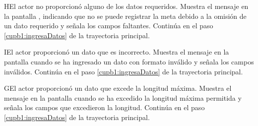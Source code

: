 \begin{UCtrayectoriaA}{H}{El actor no proporcionó alguno de los datos requeridos.}
	\UCpaso[\UCsist] Muestra el mensaje  en la pantalla ,
	indicando que no se puede registrar la meta debido a la omisión de un dato requerido y señala los campos faltantes.
	\UCpaso[] Continúa en el paso \ref{cupb1:ingresaDatos} de la trayectoria principal.
\end{UCtrayectoriaA}

\begin{UCtrayectoriaA}{I}{El actor proporcionó un dato que es incorrecto.}
	\UCpaso[\UCsist] Muestra el mensaje  en la pantalla 
	cuando se ha ingresado un dato con formato inválido y señala los campos inválidos.
	\UCpaso[] Continúa en el paso \ref{cupb1:ingresaDatos} de la trayectoria principal.
\end{UCtrayectoriaA}
 
\begin{UCtrayectoriaA}{G}{El actor proporcionó un dato que excede la longitud máxima.}
	\UCpaso[\UCsist] Muestra el mensaje  en la pantalla 
	cuando se ha excedido la longitud máxima permitida y señala los campos que excedieron la longitud.
	\UCpaso[] Continúa en el paso \ref{cupb1:ingresaDatos} de la trayectoria principal.
\end{UCtrayectoriaA}
